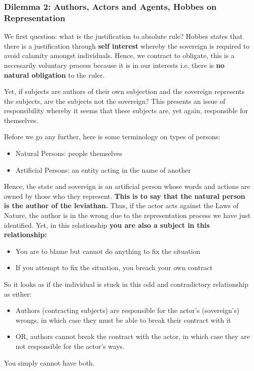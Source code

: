 \documentclass[12pt, letterpaper]{article}
\begin{document}
\subsubsection{Dilemma 2: Authors, Actors and Agents, Hobbes on Representation}
We first question: what is the justification to absolute rule? Hobbes states that there is a justification through \textbf{self interest} whereby the sovereign is required to avoid calamity amongst individuals. Hence, we contract to obligate, this is a necessarily voluntary process because it is in our interests i.e. there is \textbf{no natural obligation} to the ruler.

Yet, if subjects are authors of their own subjection and the sovereign represents the subjects, are the subjects not the sovereign? This presents an issue of responsibility whereby it seems that these subjects are, yet again, responsible for themselves.

Before we go any further, here is some terminology on types of persons:
\begin{itemize}
	\item Natural Persons: people themselves
	\item Artificial Persons: an entity acting in the name of another
\end{itemize}
Hence, the state and sovereign is an artificial person whose words and actions are owned by those who they represent. \textbf{This is to say that the natural person is the author of the leviathan.} Thus, if the actor acts against the Laws of Nature, the author is in the wrong due to the representation process we have just identified. Yet, in this relationship \textbf{you are also a subject in this relationship:}
\begin{itemize}
	\item You are to blame but cannot do anything to fix the situation
	\item If you attempt to fix the situation, you breach your own contract
\end{itemize}
So it looks as if the individual is stuck in this odd and contradictory relationship as either:
\begin{itemize}
	\item Authors (contracting subjects) are responsible for the actor's (sovereign's) wrongs, in which case they must be able to break their contract with it
	\item OR, authors cannot break the contract with the actor, in which case they are not responsible for the actor's ways.
\end{itemize}
You simply cannot have both.
\end{document}
